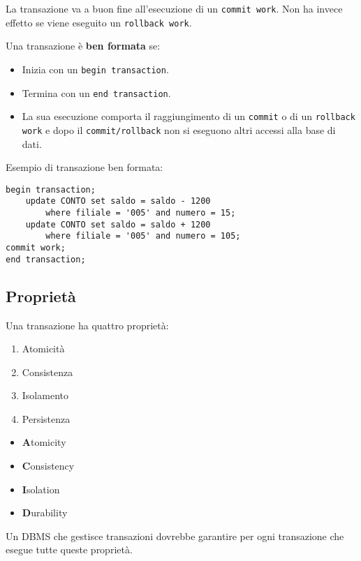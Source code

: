 \documentclass[a4paper, 10pt]{article}
\theoremstyle{definition}
\begin{document}
	La transazione va a buon fine all'esecuzione di un \lstinline|commit work|. Non ha
	invece effetto se viene eseguito un \lstinline|rollback work|.
	
	Una transazione è \textbf{ben formata} se:
	\begin{itemize}
		\item Inizia con un \lstinline|begin transaction|.
		\item Termina con un \lstinline|end transaction|.
		\item La sua esecuzione comporta il raggiungimento di un \lstinline|commit| o di un
		\lstinline|rollback work| e dopo il \lstinline|commit/rollback| non si eseguono altri
		accessi alla base di dati.
	\end{itemize}
	
	Esempio di transazione ben formata:
	\begin{lstlisting}
begin transaction;
	update CONTO set saldo = saldo - 1200
		where filiale = '005' and numero = 15;
	update CONTO set saldo = saldo + 1200
		where filiale = '005' and numero = 105;
commit work;
end transaction;
	\end{lstlisting}
	
	\subsection{Proprietà}
	
	Una transazione ha quattro proprietà:
	\begin{multicols}{2}
		\begin{enumerate}
			\item Atomicità
			\item Consistenza
			\item Isolamento
			\item Persistenza
		\end{enumerate}
		
		\columnbreak
		
		\begin{itemize}
			\item[] \textbf{A}tomicity
			\item[] \textbf{C}onsistency
			\item[] \textbf{I}solation
			\item[] \textbf{D}urability
		\end{itemize}
	\end{multicols}
	Un DBMS che gestisce transazioni dovrebbe
	garantire per ogni transazione che esegue tutte
	queste proprietà.
	
\end{document}
